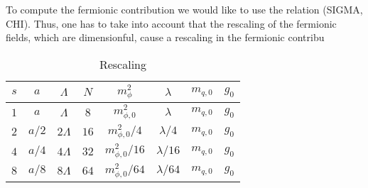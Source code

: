 To compute the fermionic contribution we would like to use the relation (SIGMA, CHI). Thus, one has to take into account that the rescaling of the fermionic fields, which are dimensionful, cause a rescaling in the fermionic contribu
\begin{table}[]
    \centering
    \begin{tabular}{cccccccc}
        \toprule
         $s$ & $a$ & $\Lambda$ & $N$ & $m_\phi^2$ & $\lambda$ & $m_{q, 0}$ & $g_0$  \\
         \midrule 
         $1$ & $a$ & $\Lambda$ & $8$ & $m_{\phi, 0}^2$ & $\lambda$ & $m_{q, 0}$ & $g_0$ \\
         $2$ & $a/2$ & $2\Lambda$ & $16$ & $m_{\phi, 0}^2 / 4$ & $\lambda / 4$ & $m_{q, 0}$ & $g_0$ \\
         $4$ & $a/4$ & $4\Lambda$ & $32$ & $m_{\phi, 0}^2 / 16$ & $\lambda / 16$ & $m_{q, 0}$ & $g_0$ \\
         $8$ & $a/8$ & $8\Lambda$ & $64$ & $m_{\phi, 0}^2 / 64$ & $\lambda / 64$ & $m_{q, 0}$ & $g_0$ \\
         \bottomrule
    \end{tabular}
    \caption{Rescaling}
    \label{block_spin_steps}
\end{table}


\newpage 






